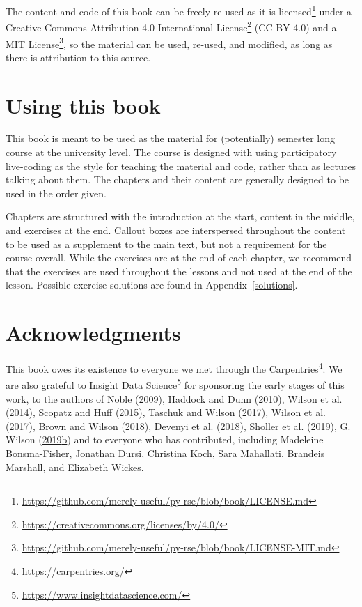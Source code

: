 \documentclass[
]{krantz}
\renewcommand{\href}[2]{#2\footnote{\url{#1}}}
\begin{document}
The content and code of this book can be freely re-used as it is
\href{https://github.com/merely-useful/py-rse/blob/book/LICENSE.md}{licensed}
under a
\href{https://creativecommons.org/licenses/by/4.0/}{Creative Commons Attribution 4.0 International License}
(CC-BY 4.0)
and a
\href{https://github.com/merely-useful/py-rse/blob/book/LICENSE-MIT.md}{MIT License},
so the material can be used, re-used, and modified,
as long as there is attribution to this source.

\hypertarget{using-this-book}{%
\section{Using this book}\label{using-this-book}}

This book is meant to be used as the material for (potentially) semester
long course at the university level.
The course is designed with using participatory live-coding as the style
for teaching the material and code, rather than as lectures talking about them.
The chapters and their content are generally designed to be used in the order
given.

Chapters are structured with the introduction at the start, content in the middle,
and exercises at the end. Callout boxes are interspersed throughout the content
to be used as a supplement to the main text, but not a requirement for the course
overall.
While the exercises are at the end of each chapter, we recommend that the
exercises are used throughout the lessons and not used at the end of the lesson.
Possible exercise solutions are found in Appendix~\ref{solutions}.

\hypertarget{intro-ack}{%
\section{Acknowledgments}\label{intro-ack}}

This book owes its existence to
everyone we met through \href{https://carpentries.org/}{the Carpentries}.
We are also grateful to \href{https://www.insightdatascience.com/}{Insight Data Science} for sponsoring the early stages of this work,
to the authors of Noble (\protect\hyperlink{ref-Nobl2009}{2009}), Haddock and Dunn (\protect\hyperlink{ref-Hadd2010}{2010}), Wilson et al. (\protect\hyperlink{ref-Wils2014}{2014}), Scopatz and Huff (\protect\hyperlink{ref-Scop2015}{2015}), Taschuk and Wilson (\protect\hyperlink{ref-Tasc2017}{2017}), Wilson et al. (\protect\hyperlink{ref-Wils2017}{2017}), Brown and Wilson (\protect\hyperlink{ref-Brow2018}{2018}), Devenyi et al. (\protect\hyperlink{ref-Deve2018}{2018}), Sholler et al. (\protect\hyperlink{ref-Shol2019}{2019}), G. Wilson (\protect\hyperlink{ref-Wils2019}{2019}\protect\hyperlink{ref-Wils2019}{b})
and to everyone who has contributed, including Madeleine Bonsma-Fisher,
Jonathan Dursi,
Christina Koch,
Sara Mahallati,
Brandeis Marshall,
and Elizabeth Wickes.
\end{document}
